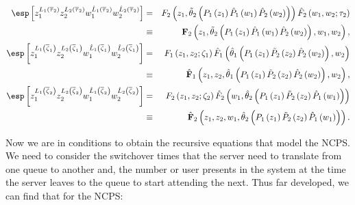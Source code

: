 \begin{eqnarray*}
\esp\left[z_{1}^{L_{1}\left(\overline{\tau}_{2}\right)}z_{2}^{L_{2}\left(\overline{\tau}_{2}\right)}w_{1}^{\hat{L}_{1}\left(\overline{\tau}_{2}\right)}w_{2}^{\hat{L}_{2}\left(\overline{\tau}_{2}\right)}\right]&=&F_{2}\left(z_{1},\tilde{\theta}_{2}\left(P_{1}\left(z_{1}\right)\hat{P}_{1}\left(w_{1}\right)\hat{P}_{2}\left(w_{2}\right)\right)\right)
\hat{F}_{2}\left(w_{1},w_{2};\tau_{2}\right)\\
&\equiv& \mathbf{F}_{2}\left(z_{1},\tilde{\theta}_{2}\left(P_{1}\left(z_{1}\right)\hat{P}_{1}\left(w_{1}\right)\hat{P}_{2}\left(w_{2}\right)\right),w_{1},w_{2}\right),\\
\esp\left[z_{1}^{L_{1}\left(\overline{\zeta}_{1}\right)}z_{2}^{L_{2}\left(\overline{\zeta}_{1}
\right)}w_{1}^{\hat{L}_{1}\left(\overline{\zeta}_{1}\right)}w_{2}^{\hat{L}_{2}\left(\overline{\zeta}_{1}\right)}\right]
&=&F_{1}\left(z_{1},z_{2};\zeta_{1}\right)\hat{F}_{1}\left(\hat{\theta}_{1}\left(P_{1}\left(z_{1}\right)\tilde{P}_{2}\left(z_{2}\right)\hat{P}_{2}\left(w_{2}\right)\right),w_{2}\right)\\
&\equiv&\hat{\mathbf{F}}_{1}\left(z_{1},z_{2},\hat{\theta}_{1}\left(P_{1}\left(z_{1}\right)\tilde{P}_{2}\left(z_{2}\right)\hat{P}_{2}\left(w_{2}\right)\right),w_{2}\right),\\
\esp\left[z_{1}^{L_{1}\left(\overline{\zeta}_{2}\right)}z_{2}^{L_{2}\left(\overline{\zeta}_{2}\right)}w_{1}^{\hat{L}_{1}\left(\overline{\zeta}_{2}\right)}w_{2}^{\hat{L}_{2}\left(\overline{\zeta}_{2}\right)}\right]
&=&F_{2}\left(z_{1},z_{2};\zeta_{2}\right)\hat{F}_{2}\left(w_{1},\hat{\theta}_{2}\left(P_{1}\left(z_{1}\right)\tilde{P}_{2}\left(z_{2}\right)\hat{P}_{1}\left(w_{1}\right)\right)\right)\\
&\equiv&\hat{\mathbf{F}}_{2}\left(z_{1},z_{2},w_{1},\hat{\theta}_{2}\left(P_{1}\left(z_{1}\right)\tilde{P}_{2}\left(z_{2}\right)\hat{P}_{1}\left(w_{1}\right)\right)\right).
\end{eqnarray*}

Now we are in conditions to obtain the recursive equations that model the NCPS. We need to consider the switchover times that the server need to translate from one queue to another and, the number or user presents in the system at the time the server leaves to the queue to start attending the next. Thus far developed, we can find that for the NCPS:

